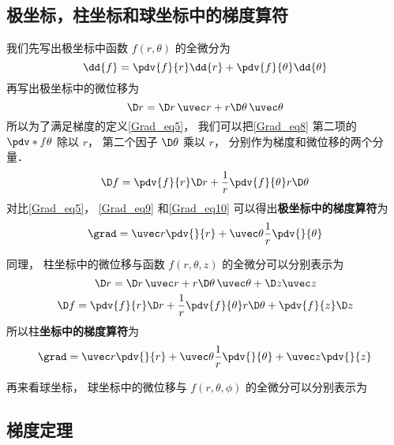 \subsection{极坐标，柱坐标和球坐标中的梯度算符}

我们先写出极坐标中函数 $f(r,\theta)$ 的全微分为
\begin{equation}\label{Grad_eq8}
\dd{f} = \pdv{f}{r} \dd{r} + \pdv{f}{\theta} \dd{\theta}
\end{equation}
再写出极坐标中的微位移为%
\begin{equation}\label{Grad_eq9}
\D r = \D r \,\uvec r + r\D \theta \,\uvec \theta
\end{equation}
所以为了满足梯度的定义\autoref{Grad_eq5}， 我们可以把\autoref{Grad_eq8} 第二项的 $\pdv*{f}{\theta}$ 除以 $r$， 第二个因子 $\D \theta$ 乘以 $r$， 分别作为梯度和微位移的两个分量．
\begin{equation}\label{Grad_eq10}
\D f = \pdv{f}{r} \D r + \frac 1r \pdv{f}{\theta}  r\D \theta
\end{equation}
对比\autoref{Grad_eq5}， \autoref{Grad_eq9} 和\autoref{Grad_eq10} 可以得出\textbf{极坐标中的梯度算符}为
\begin{equation}
\grad = \uvec r \pdv{}{r} + \uvec \theta \frac 1r \pdv{}{\theta}
\end{equation}

同理， 柱坐标中的微位移与函数 $f(r,\theta, z)$ 的全微分可以分别表示为
\begin{equation}
\D r = \D r \,\uvec r + r\D \theta \,\uvec \theta + \D z \uvec z
\end{equation}
\begin{equation}
\D f = \pdv{f}{r} \D r + \frac 1r \pdv{f}{\theta}  r\D \theta + \pdv{f}{z}\D z
\end{equation}
所以柱\textbf{坐标中的梯度算符}为
\begin{equation}
\grad = \uvec r \pdv{}{r} + \uvec \theta \frac 1r \pdv{}{\theta} + \uvec z \pdv{}{z}
\end{equation}

再来看球坐标， 球坐标中的微位移与 $f(r,\theta,\phi)$ 的全微分可以分别表示为



\subsection{梯度定理}

